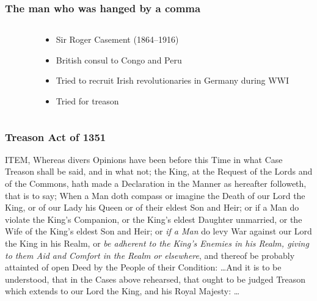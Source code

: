 \begin{frame}
  \frametitle{The man who was hanged by a comma}

\begin{columns}
\begin{column}{3cm}
\end{column}
\begin{column}{7cm}
\begin{itemize}
\item Sir Roger Casement (1864--1916)
\item British consul to Congo and Peru
\item Tried to recruit Irish revolutionaries in Germany during WWI
\item Tried for treason
\end{itemize}
\end{column}
\end{columns}

\end{frame}

\begin{frame}
  \frametitle{Treason Act of 1351}

\small
ITEM, Whereas divers Opinions have been before this Time in what Case
Treason shall be said, and in what not; the King, at the Request of
the Lords and of the Commons, hath made a Declaration in the Manner as
hereafter followeth, that is to say; When a Man doth compass or
imagine the Death of our Lord the King, or of our Lady his Queen or of
their eldest Son and Heir; or if a Man do violate the King's
Companion, or the King's eldest Daughter unmarried, or the Wife of the
King's eldest Son and Heir; or \emph{if a Man} do levy War against our Lord
the King in his Realm, or \emph{be adherent to the King's Enemies in his
Realm, giving to them Aid and Comfort in the Realm} \emph{or elsewhere}, and
thereof be probably attainted of open Deed by the People of their
Condition: \dots And it is to be
understood, that in the Cases above rehearsed, that ought to be judged
Treason which extends to our Lord the King, and his Royal Majesty:
\dots

\end{frame}

